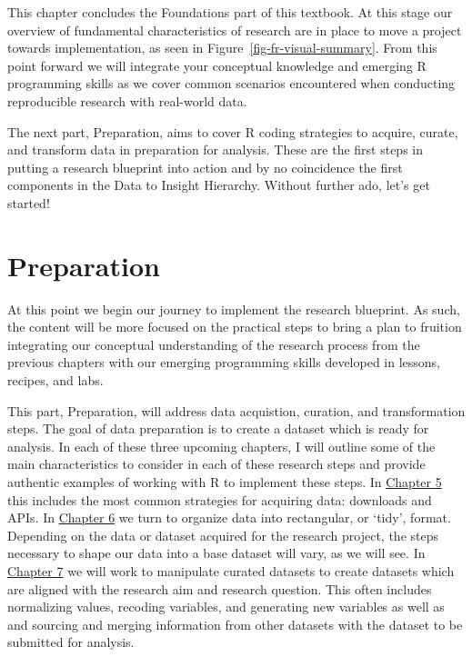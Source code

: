 \documentclass[
  letterpaper,
]{latex/krantz}
\theoremstyle{definition}
\theoremstyle{remark}
\begin{document}
This chapter concludes the Foundations part of this textbook. At this
stage our overview of fundamental characteristics of research are in
place to move a project towards implementation, as seen in
Figure~\ref{fig-fr-visual-summary}. From this point forward we will
integrate your conceptual knowledge and emerging R programming skills as
we cover common scenarios encountered when conducting reproducible
research with real-world data.

The next part, Preparation, aims to cover R coding strategies to
acquire, curate, and transform data in preparation for analysis. These
are the first steps in putting a research blueprint into action and by
no coincidence the first components in the Data to Insight Hierarchy.
Without further ado, let's get started!

\part{Preparation}

At this point we begin our journey to implement the research blueprint.
As such, the content will be more focused on the practical steps to
bring a plan to fruition integrating our conceptual understanding of the
research process from the previous chapters with our emerging
programming skills developed in lessons, recipes, and labs.

This part, Preparation, will address data acquistion, curation, and
transformation steps. The goal of data preparation is to create a
dataset which is ready for analysis. In each of these three upcoming
chapters, I will outline some of the main characteristics to consider in
each of these research steps and provide authentic examples of working
with R to implement these steps. In
\hyperref[sec-acquire-chapter]{Chapter 5} this includes the most common
strategies for acquiring data: downloads and APIs. In
\hyperref[sec-curate-data]{Chapter 6} we turn to organize data into
rectangular, or `tidy', format. Depending on the data or dataset
acquired for the research project, the steps necessary to shape our data
into a base dataset will vary, as we will see. In
\hyperref[sec-transform-data]{Chapter 7} we will work to manipulate
curated datasets to create datasets which are aligned with the research
aim and research question. This often includes normalizing values,
recoding variables, and generating new variables as well as and sourcing
and merging information from other datasets with the dataset to be
submitted for analysis.
\end{document}
